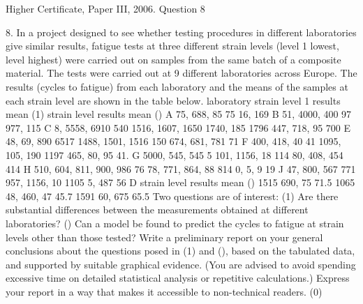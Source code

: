 \documentclass[a4paper,12pt]{article}
\begin{document}
Higher Certificate, Paper III, 2006. Question 8

\begin{framed}
8.
In a project designed to see whether testing procedures in different laboratories give
similar results, fatigue tests at three different strain levels (level 1 lowest, level 
highest) were carried out on samples from the same batch of a composite material.
The tests were carried out at 9 different laboratories across Europe. The results
(cycles to fatigue) from each laboratory and the means of the samples at each strain
level are shown in the table below.
laboratory strain level 1
results mean
(1) strain level 
results mean
() A 75, 688, 85 75 16, 169 B 51, 4000, 400 97 977, 115 C 8, 5558, 6910 540 1516, 1607, 1650 1740, 185 1796 447, 718, 95 700
E 48, 69, 890 6517 1488, 1501, 1516 150 674, 681, 781 71
F 400, 418, 40 41 1095, 105, 190 1197 465, 80, 95 41.
G 5000, 545, 545 5 101, 1156, 18 114 80, 408, 454 414
H 510, 604, 811,
900, 986 76 78, 771, 864,
88 814 0, 5, 9 19
J 47, 800, 567 771 957, 1156, 10 1105 5, 487 56
D
strain level 
results mean
()
1515 690, 75 71.5
1065 48, 460, 47 45.7
1591 60, 675 65.5
Two questions are of interest:
(1) Are there substantial differences between the measurements obtained at
different laboratories?
() Can a model be found to predict the cycles to fatigue at strain levels other than
those tested?
Write a preliminary report on your general conclusions about the questions posed in
(1) and (), based on the tabulated data, and supported by suitable graphical evidence.
(You are advised to avoid spending excessive time on detailed statistical analysis or
repetitive calculations.)
Express your report in a way that makes it accessible to non-technical readers.
(0)
\end{framed}
\end{document}
